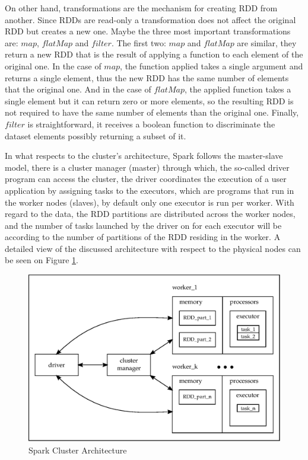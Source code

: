 On other hand, transformations are the mechanism for creating RDD from another. Since RDDs are read-only a transformation does not affect the original RDD but creates a new one. Maybe the three most important transformations are: $map$, $flatMap$ and $filter$. The first two: $map$ and $flatMap$ are similar, they return a new RDD that is the result of applying a function to each element of the original one. In the case of $map$, the function applied takes a single argument and returns a single element, thus the new RDD has the same number of elements that the original one. And in the case of $flatMap$, the applied function takes a single element but it can return zero or more elements, so the resulting RDD is not required to have the same number of elements than the original one. Finally, $filter$ is straightforward, it receives a boolean function to discriminate the dataset elements possibly returning a subset of it.

In what respects to the cluster's architecture, Spark follows the master-slave model, there is a cluster manager (master) through which, the so-called driver program can access the cluster, the driver coordinates the execution of a user application by assigning tasks to the executors, which are programs that run in the worker nodes (slaves), by default only one executor is run per worker. With regard to the data, the RDD partitions are distributed across the worker nodes, and the number of tasks launched by the driver on for each executor will be according to the number of partitions of the RDD residing in the worker. A detailed view of the discussed architecture with respect to the physical nodes can be seen on Figure \ref{fig:sparkArch}.

\begin{figure}
  \includegraphics[width=1\textwidth]{figures/fig1.eps}
\caption{Spark Cluster Architecture}
\label{fig:sparkArch}
\end{figure}

